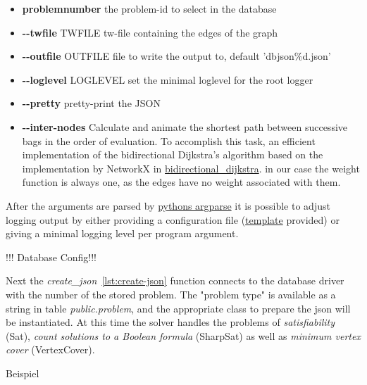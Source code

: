 \documentclass[a4paper, 12pt]{scrartcl}
\begin{document}
\begin{itemize}
	\item
	\textbf{problemnumber}
	 the problem-id to select in the database
	 
	\item
	\textbf{-{}-twfile }TWFILE
	tw-file containing the edges of the graph 
	
	\item
	\textbf{-{}-outfile }OUTFILE
	 file to write the output to, default 'dbjson\%d.json'
	 
	\item
	\textbf{-{}-loglevel }LOGLEVEL
	 set the minimal loglevel for the root logger
	 
	\item
	\textbf{-{}-pretty}
	 pretty-print the JSON
	 
	\item
	\textbf{-{}-inter-nodes}
	Calculate and animate the shortest path between successive bags in the order of evaluation. To accomplish this task, an efficient implementation of the bidirectional Dijkstra's algorithm \cite{shortestPathAlgo} based on the implementation by NetworkX \cite{SciPyProceedings_11} in \href{https://networkx.github.io/documentation/networkx-2.1/reference/algorithms/generated/networkx.algorithms.shortest_paths.weighted.bidirectional_dijkstra.html#networkx.algorithms.shortest_paths.weighted.bidirectional_dijkstra}{bidirectional\_dijkstra}.
	in our case the weight function is always one, as the edges have no weight associated with them.
\end{itemize}
After the arguments are parsed by \href{https://docs.python.org/3/library/argparse.html}{pythons argparse} it is possible to adjust logging output by either providing a configuration file (\href{https://github.com/VaeterchenFrost/tdvisu/blob/master/tdvisu/logging.yml}{template} provided) or giving a minimal logging level per program argument.

!!! Database Config!!!

Next the \textit{create\_json}~\ref{lst:create-json} function connects to the database driver with 
the number of the stored problem. 
The "problem type" is available as a string in table \emph{public.problem}, and the appropriate class to prepare the json will be instantiated. At this time the solver handles the problems of \textit{satisfiability} (Sat), \textit{count solutions to a Boolean formula} (SharpSat) as well as \textit{minimum vertex cover} (VertexCover).


Beispiel
\end{document}

